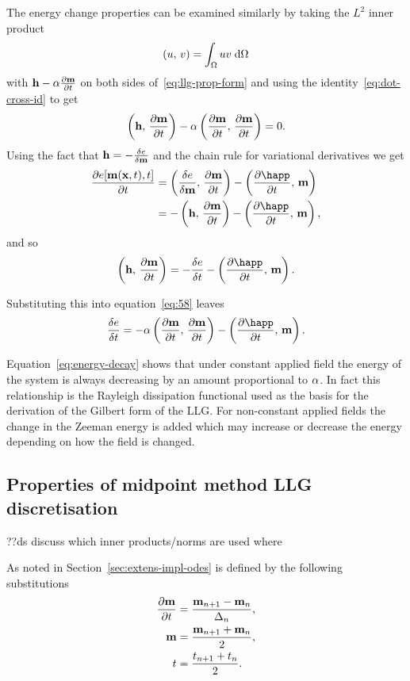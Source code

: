 The energy change properties can be examined similarly by taking the $L^2$ inner product
\begin{equation}
  \left(u,\, v \right) = \int_\Omega u v {\; \text{d}}\Omega
\end{equation}
with $\mathbf{h} - \alpha \frac{\partial \mathbf{m}}{\partial t}$ on both sides of~\eqref{eq:llg-prop-form} and using the identity~\eqref{eq:dot-cross-id} to get
\begin{equation}
  \label{eq:58}
  \left(\mathbf{h},\, \frac{\partial \mathbf{m}}{\partial t} \right) - \alpha \left(\frac{\partial \mathbf{m}}{\partial t},\, \frac{\partial \mathbf{m}}{\partial t} \right) = 0.
\end{equation}
Using the fact that $\mathbf{h} = -\frac{\delta e}{\delta \mathbf{m}}$ and the chain rule for variational derivatives\cite{??ds} we get
\begin{align*}
  \pd{\e[\mv(\xv, t), t]}{t} &= \ip{\vd{e}{\mv}}{\dmdt} - \ip{\pd{\happ}{t}}{\mv} \\
             &= -\ip{\hv}{\dmdt} - \ip{\pd{\happ}{t}}{\mv},
\end{align*}
and so
\begin{equation}
  \ip{\hv}{\dmdt} = -\vd{\e}{t} - \ip{\pd{\happ}{t}}{\mv}.
\end{equation}

Substituting this into equation~\eqref{eq:58} leaves
\begin{equation}
  \label{eq:energy-decay}
  \vd{\e}{t} = -\dampc \ip{\dmdt}{\dmdt} - \ip{\pd{\happ}{t}}{\mv}.
\end{equation}

Equation~\eqref{eq:energy-decay} shows that under constant applied field the energy of the system is always decreasing by an amount proportional to $\alpha$.
In fact this relationship is the Rayleigh dissipation functional used as the basis for the derivation of the Gilbert form of the LLG.\cite{Gilbert2004}
For non-constant applied fields the change in the Zeeman energy is added which may increase or decrease the energy depending on how the field is changed. %


\subsection{Properties of midpoint method LLG discretisation}
\label{sec:prop-midp-meth}

??ds discuss which inner products/norms are used where

As noted in Section~\ref{sec:extens-impl-odes} \imr is defined by the following substitutions
\begin{align}
  \label{eq:55}
  \frac{\partial \mathbf{m}}{\partial t} &= \frac{\mathbf{m}_{n+1} - \mathbf{m}_n}{\Delta_{n}}, \\
  \mathbf{m} &= \frac{\mathbf{m}_{n+1} + \mathbf{m}_n}{2}, \\
  t &=  \frac{t_{n+1} + t_n}{2}.
\end{align}

